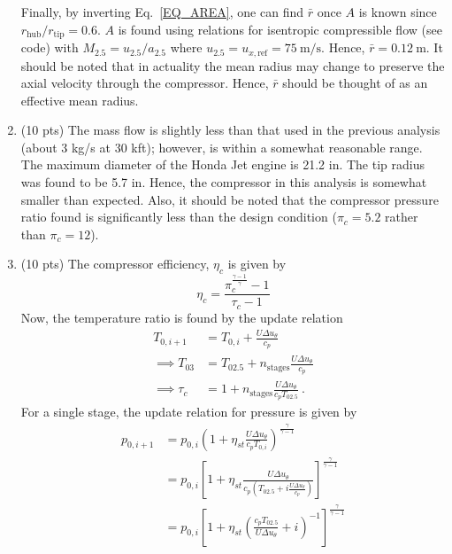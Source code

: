 \documentclass[12pt]{article}
\begin{document}
\begin{enumerate}[label=(\alph*)]
		Finally, by inverting Eq.~\ref{EQ_AREA}, one can find $\bar{r}$ once $A$ is known since $r_\mathrm{hub}/r_\mathrm{tip}=0.6$. $A$ is found using relations for isentropic compressible flow (see code) with $M_{2.5}=u_{2.5}/a_{2.5}$ where $u_{2.5}=u_{x,\mathrm{ref}}=75\ \mathrm{m/s}$. Hence, $\boxed{\bar{r}=0.12\ \mathrm{m}}$. It should be noted that in actuality the mean radius may change to preserve the axial velocity through the compressor. Hence, $\bar{r}$ should be thought of as an effective mean radius.
	\item (10 pts)
		The mass flow is slightly less than that used in the previous analysis (about 3 kg/s at 30 kft); however, is within a somewhat reasonable range. The maximum diameter of the Honda Jet engine is 21.2 in. The tip radius was found to be 5.7 in. Hence, the compressor in this analysis is somewhat smaller than expected. Also, it should be noted that the compressor pressure ratio found is significantly less than the design condition ($\pi_c=5.2$ rather than $\pi_c=12$).
	\item (10 pts)
		The compressor efficiency, $\eta_c$ is given by
		\begin{equation}
			\label{EQ_ETAC}
			\eta_c=\frac{\pi_c^{\frac{\gamma-1}{\gamma}}-1}{\tau_c-1}
		\end{equation}
		Now, the temperature ratio is found by the update relation
		\begin{equation}
			\begin{aligned}
				T_{0,i+1} &= T_{0,i}+\frac{U\Delta u_\theta}{c_p}\\ \implies
				T_{03} &= T_{02.5}+n_\mathrm{stages}\frac{U\Delta u_\theta}{c_p} \\
				\implies \tau_c&=1+n_\mathrm{stages}\frac{U\Delta u_\theta}{c_pT_{02.5}}\ .
			\end{aligned}
		\end{equation}
		For a single stage, the update relation for pressure is given by 
		\begin{equation}
			\begin{aligned}
				p_{0,i+1} &= p_{0,i}\left(1+\eta_{st}\frac{U\Delta u_\theta}{c_pT_{0,i}}\right)^{\frac{\gamma}{\gamma-1}}\\ 
				&= p_{0,i}\left[1+\eta_{st}\frac{U\Delta u_\theta}{c_p\left(T_{02.5}+i\frac{U\Delta u_\theta}{c_p}\right)}\right]^{\frac{\gamma}{\gamma-1}}\\
				&=p_{0,i}\left[1+\eta_{st}\left(\frac{c_pT_{02.5}}{U\Delta u_\theta}+i\right)^{-1}\right]^{\frac{\gamma}{\gamma-1}}\\

\end{aligned}
\end{equation}
\end{enumerate}
\end{document}
